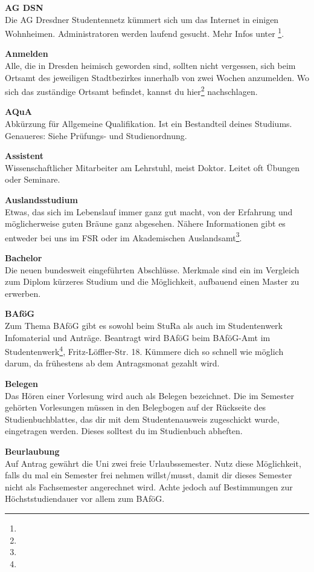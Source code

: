
\textbf{AG DSN} \\
Die AG Dresdner Studentennetz kümmert sich um das Internet in einigen Wohnheimen.
Administratoren werden laufend gesucht.
Mehr Infos unter \footnote{}.

\textbf{Anmelden} \\
Alle, die in Dresden heimisch geworden sind, sollten nicht vergessen, sich beim Ortsamt des jeweiligen Stadtbezirkes innerhalb von zwei Wochen anzumelden.
Wo sich das zuständige Ortsamt befindet, kannst du hier\footnote{} nachschlagen.

\textbf{AQuA} \\
Abkürzung für Allgemeine Qualifikation.
Ist ein Bestandteil deines Studiums.
Genaueres:
Siehe Prüfungs- und Studienordnung.

\textbf{Assistent} \\
Wissenschaftlicher Mitarbeiter am Lehrstuhl, meist Doktor.
Leitet oft Übungen oder Seminare.

\textbf{Auslandsstudium} \\
Etwas, das sich im Lebenslauf immer ganz gut macht, von der Erfahrung und möglicherweise guten Bräune ganz abgesehen.
Nähere Informationen gibt es entweder bei uns im FSR oder im Akademischen Auslandsamt\footnote{}.

\textbf{Bachelor} \\
Die neuen bundesweit eingeführten Abschlüsse.
Merkmale sind ein im Vergleich zum Diplom kürzeres Studium und die Möglichkeit, aufbauend einen Master zu erwerben.

\textbf{BAföG} \\
Zum Thema BAföG gibt es sowohl beim StuRa als auch im Studentenwerk Infomaterial und Anträge.
Beantragt wird BAföG beim BAföG-Amt im Studentenwerk\footnote{}, Fritz-Löffler-Str. 18.
Kümmere dich so schnell wie möglich darum, da frühestens ab dem Antragsmonat gezahlt wird.

\textbf{Belegen} \\
Das Hören einer Vorlesung wird auch als Belegen bezeichnet.
Die im Semester gehörten Vorlesungen müssen in den Belegbogen auf der Rückseite des Studienbuchblattes, das dir mit dem Studentenausweis zugeschickt wurde, eingetragen werden.
Dieses solltest du im Studienbuch abheften.

\textbf{Beurlaubung} \\
Auf Antrag gewährt die Uni zwei freie Urlaubssemester.
Nutz diese Möglichkeit, falls du mal ein Semester frei nehmen willst/musst, damit dir dieses Semester nicht als Fachsemester angerechnet wird.
Achte jedoch auf Bestimmungen zur Höchststudiendauer vor allem zum BAföG.

